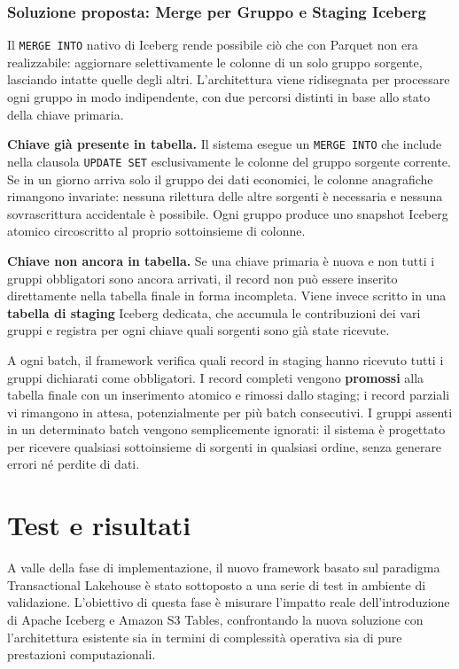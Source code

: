 \documentclass[12pt,a4paper,openright,twoside]{book}
\begin{document}
\subsection{Soluzione proposta: Merge per Gruppo e Staging Iceberg}

Il \texttt{MERGE INTO} nativo di Iceberg rende possibile ciò che con Parquet non era realizzabile: aggiornare selettivamente le colonne di un solo gruppo sorgente, lasciando intatte quelle degli altri. L'architettura viene ridisegnata per processare ogni gruppo in modo indipendente, con due percorsi distinti in base allo stato della chiave primaria.

\textbf{Chiave già presente in tabella.} Il sistema esegue un \texttt{MERGE INTO} che include nella clausola \texttt{UPDATE SET} esclusivamente le colonne del gruppo sorgente corrente. Se in un giorno arriva solo il gruppo dei dati economici, le colonne anagrafiche rimangono invariate: nessuna rilettura delle altre sorgenti è necessaria e nessuna sovrascrittura accidentale è possibile. Ogni gruppo produce uno snapshot Iceberg atomico circoscritto al proprio sottoinsieme di colonne.

\textbf{Chiave non ancora in tabella.} Se una chiave primaria è nuova e non tutti i gruppi obbligatori sono ancora arrivati, il record non può essere inserito direttamente nella tabella finale in forma incompleta. Viene invece scritto in una \textbf{tabella di staging} Iceberg dedicata, che accumula le contribuzioni dei vari gruppi e registra per ogni chiave quali sorgenti sono già state ricevute.

A ogni batch, il framework verifica quali record in staging hanno ricevuto tutti i gruppi dichiarati come obbligatori. I record completi vengono \textbf{promossi} alla tabella finale con un inserimento atomico e rimossi dallo staging; i record parziali vi rimangono in attesa, potenzialmente per più batch consecutivi. I gruppi assenti in un determinato batch vengono semplicemente ignorati: il sistema è progettato per ricevere qualsiasi sottoinsieme di sorgenti in qualsiasi ordine, senza generare errori né perdite di dati.

\chapter{Test e risultati}
\label{chap:testing-and-results}

A valle della fase di implementazione, il nuovo framework basato sul paradigma Transactional Lakehouse è stato sottoposto a una serie di test in ambiente di validazione. 
L'obiettivo di questa fase è misurare l'impatto reale dell'introduzione di Apache Iceberg e Amazon S3 Tables, confrontando la nuova soluzione con l'architettura esistente sia in termini di complessità operativa sia di pure prestazioni computazionali.
\end{document}
